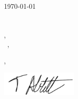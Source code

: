 \documentclass[usenames, dvipsnames]{resume} %
\begin{document}
	
\today\\

\vspace{-0.1in}\recipient\\
\company\\
\city, \state\\

\vspace{-0.1in}\greeting\ \recipient,\\

\vspace{-0.1in}\setlength\parindent{24pt}
\noindent

\vspace{0.1in}
\vfill

\begin{flushright}
\closer,

\vspace{-0.1in}\includegraphics[width=1.5in]{signature.png}\vspace{-0.1in}

\myname\\
\mytitle
\end{flushright}



\end{document}
